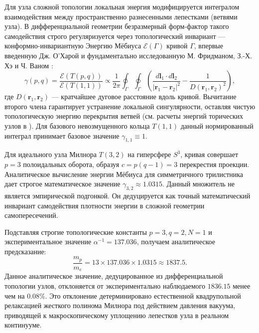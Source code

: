 \documentclass[11pt,a4paper]{article}
\begin{document}
	Для узла сложной топологии локальная энергия модифицируется интегралом взаимодействия между пространственно разнесенными лепестками (ветвями узла). В дифференциальной геометрии безразмерный форм-фактор такого самодействия строго регуляризуется через топологический инвариант — конформно-инвариантную Энергию Мёбиуса $\mathcal{E}(\Gamma)$ кривой $\Gamma$, впервые введенную Дж. О'Харой \cite{ohara1991} и фундаментально исследованную М. Фридманом, З.-Х. Хэ и Ч. Ваном \cite{freedman1994}:
	\begin{equation}
		\gamma(p,q) = \frac{\mathcal{E}(T(p,q))}{\mathcal{E}(T(1,1))} \propto \frac{1}{2\pi} \oint_{\Gamma} \oint_{\Gamma} \left( \frac{d\mathbf{l}_1 \cdot d\mathbf{l}_2}{|\mathbf{r}_1 - \mathbf{r}_2|^2} - \frac{1}{D(\mathbf{r}_1, \mathbf{r}_2)^2} \right),
	\end{equation}
	где $D(\mathbf{r}_1, \mathbf{r}_2)$ — кратчайшее дуговое расстояние вдоль кривой. Вычитание второго члена гарантирует устранение локальной сингулярности, оставляя чистую топологическую энергию перекрытия ветвей (см. расчеты энергий торических узлов в \cite{kusner1998}). Для базового невозмущенного кольца $T(1,1)$ данный нормированный интеграл принимает базовое значение $\gamma_{1,1} \equiv 1$. 
	
	Для идеального узла Милнора $T(3,2)$ на гиперсфере $S^3$, кривая совершает $p=3$ полоидальных оборота, образуя $c = p(q-1) = 3$ перекрестия проекции. Аналитическое вычисление энергии Мёбиуса для симметричного трилистника дает строгое математическое значение $\gamma_{3,2} \approx 1.0315$. 
	Данный множитель не является эмпирической подгонкой. Он дедуцируется как точный математический инвариант самодействия плотности энергии в сложной геометрии самопересечений.
	
	Подставляя строгие топологические константы $p=3, q=2, N=1$ и экспериментальное значение $\alpha^{-1} = 137.036$, получаем аналитическое предсказание:
	\begin{equation}
		\frac{m_p}{m_e} = 13 \times 137.036 \times 1.0315 \approx \mathbf{1837.5}.
	\end{equation}
	Данное аналитическое значение, дедуцированное из дифференциальной топологии узлов, отклоняется от экспериментально наблюдаемого $1836.15$ менее чем на $0.08\%$. Это отклонение детерминировано естественной квадрупольной релаксацией жесткого полинома Милнора под действием давления вакуума, приводящей к макроскопическому уплощению лепестков узла в реальном континууме.	
	
\end{document}
